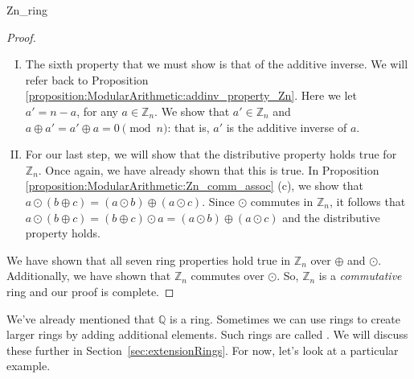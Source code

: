 \begin{example}{Zn_ring}
\begin{proof}
\begin{enumerate}[(I)]
$a \odot b    =  b \odot a$, for all $a,b\in{\mathbb Z}_n$.  Note that for a set to be a ring, we only need to show that commutativity of \emph{addition} holds.  Because commutativity of \emph{multiplication} also holds for ${\mathbb Z}_n$, we may also have a \emph{commutative} ring.  Let's continue with our proof that ${\mathbb Z}_n$ is a ring before we jump to that conclusion.
\item The sixth property that we must show is that of the additive inverse.  We will refer back to Proposition \ref{proposition:ModularArithmetic:addinv_property_Zn}.  Here we let $a' = n-a$, for any $a\in{\mathbb Z}_n$.  We show that $a'\in{\mathbb Z}_n$ and $a \oplus a' = a' \oplus a  = 0 \pmod{ n}$: that is, $a'$ is the additive inverse of $a$.
\item For our last step, we will show that the distributive property holds true for ${\mathbb Z}_n$. Once again, we have already shown that this is true.  In Proposition \ref{proposition:ModularArithmetic:Zn_comm_assoc} (c), we show that $a \odot (b \oplus c)  = (a \odot b)\oplus (a \odot c)$.  Since $\odot$ commutes in ${\mathbb Z}_n$, it follows that $a \odot (b \oplus c)  = (b \oplus c) \odot a= (a \odot b)\oplus (a \odot c)$ and the distributive property holds.
\end{enumerate}
We have shown that all seven ring properties hold true in ${\mathbb Z}_n$ over $\oplus$ and $\odot$. Additionally, we have shown that ${\mathbb Z}_n$ commutes over $\odot$.  So, ${\mathbb Z}_n$ is a \emph{commutative} ring and our proof is complete.
\end{proof}
\end{example}

We've already mentioned that ${\mathbb Q}$ is a ring. Sometimes we can use rings to create larger rings by adding additional elements. Such rings are called . We will discuss these further in Section~\ref{sec:extensionRings}. For now, let's look at a particular example.


